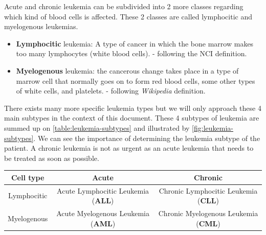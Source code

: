 \documentclass[11pt, openany]{report}
\theoremstyle{plain}
\theoremstyle{definition}
\theoremstyle{remark}
\begin{document}
Acute and chronic leukemia can be subdivided into 2 more classes regarding which kind of blood cells is affected. These 2 classes are called lymphocitic and myelogenous leukemias. 

\begin{itemize}
\item \textbf{Lymphocitic} leukemia: A type of cancer in which the bone marrow makes too many lymphocytes (white blood cells). - following the NCI \cite{NCI} definition. 
\item \textbf{Myelogenous} leukemia: the cancerous change takes place in a type of marrow cell that normally goes on to form red blood cells, some other types of white cells, and platelets. - following \textit{Wikipedia} \cite{wiki} definition. 
\end{itemize} 

There exists many more specific leukemia types but we will only approach these 4 main subtypes in the context of this document. These 4 subtypes of leukemia are summed up on \autoref{table:leukemia-subtypes} and illustrated by \autoref{fig:leukemia-subtypes}. 
We can see the importance of determining the leukemia subtype of the patient. A chronic leukemia is not as urgent as an acute leukemia that needs to be treated as soon as possible. 

\begin{center}
    \begin{tabular}{|c|c|c|}
      \hline
      Cell type & Acute & Chronic \\
      \hline
      Lymphocitic & Acute Lymphocitic Leukemia (\textbf{ALL}) & Chronic Lymphocitic Leukemia (\textbf{CLL})  \\
      \hline
      Myelogenous & Acute Myelogenous Leukemia (\textbf{AML})  & Chronic Myelogenous Leukemia (\textbf{CML})  \\
      \hline
    \end{tabular}
    \label{table:leukemia-subtypes}
\end{center}
\end{document}
